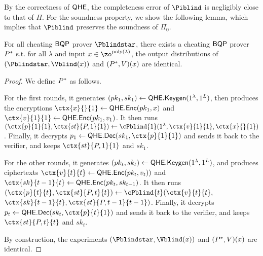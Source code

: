 By the correctness of $\mathsf{QHE}$, the completeness error of $\Piblind$ is negligibly close to that of $\Pi$.
For the soundness property, we show the following lemma, which implies that $\Piblind$ preserves the soundness of $\Pi_0$. 


\begin{thm} \label{thm:compiler-errors}
	For all cheating $\operatorname{\mathsf{BQP}}$ prover $\Pblindstar$, there exists a cheating $\operatorname{\mathsf{BQP}}$ prover $P^*$ s.t. for all $\lambda$ and input $x\in\zo^{\poly(\lambda)}$, the output distributions of $(\Pblindstar, \Vblind(x))$ and $(P^*, V)(x)$ are identical.
\end{thm}
\begin{proof}
	We define $P^*$ as follows.
	
	For the first rounds, it generates
	$(pk_1, sk_1)\leftarrow\mathsf{QHE.Keygen}(1^\lambda, 1^L)$, then produces the encryptions
	$\ctx{x}{}{1}\leftarrow\QEnc(pk_1, x)$ and $\ctx{v}{1}{1}\leftarrow\QEnc(pk_1, v_1)$.
	It then runs $(\ctx{p}{1}{1}, \ctx{st}{P, 1}{1})\leftarrow\cPblind{1}(1^\lambda, \ctx{v}{1}{1}, \ctx{x}{}{1})$.
	Finally, it decrypts $p_1\leftarrow\QDec(sk_1, \ctx{p}{1}{1})$ and sends it back to the verifier,
	and keeps $\ctx{st}{P, 1}{1}$ and $sk_1$.

	For the other rounds, it generates
	$(pk_t, sk_t)\leftarrow\mathsf{QHE.Keygen}(1^\lambda, 1^L)$, and produces ciphertexts
	$\ctx{v}{t}{t}\leftarrow\QEnc(pk_t, v_t))$ and $\ctx{sk}{t-1}{t}\leftarrow\QEnc(pk_t, sk_{t-1})$.
	It then runs $(\ctx{p}{t}{t}, \ctx{st}{P, t}{t})\leftarrow\cPblind{t}(\ctx{v}{t}{t},$ \ $\ctx{sk}{t-1}{t}, \ctx{st}{P, t-1}{t-1})$.
	Finally, it decrypts $p_t\leftarrow\QDec(sk_t, \ctx{p}{t}{1})$ and sends it back to the verifier,
	and keeps $\ctx{st}{P, t}{t}$ and $sk_t$.
		
	By construction, the experiments $(\Pblindstar, \Vblind(x))$ and $(P^*, V)(x)$ are identical.
\end{proof}


